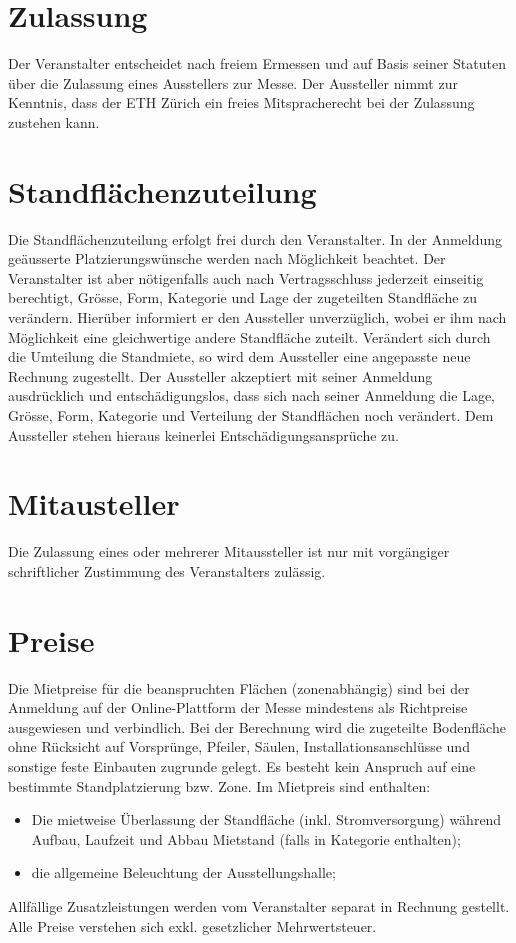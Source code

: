 \documentclass[8pt,a4paper]{article}
\begin{document}
\begin{multicols}{2}
\section{Zulassung}
Der Veranstalter entscheidet nach freiem Ermessen und auf Basis seiner Statuten über die Zulassung eines Ausstellers zur Messe. Der Aussteller nimmt zur Kenntnis, dass der ETH Zürich ein freies Mitspracherecht bei der Zulassung zustehen kann.

\section{Standflächenzuteilung}
Die Standflächenzuteilung erfolgt frei durch den Veranstalter. In der Anmeldung geäusserte Platzierungswünsche werden nach Möglichkeit beachtet. Der Veranstalter ist aber nötigenfalls auch nach Vertragsschluss jederzeit einseitig berechtigt, Grösse, Form, Kategorie und Lage der zugeteilten Standfläche zu verändern. Hierüber informiert er den Aussteller unverzüglich, wobei er ihm nach Möglichkeit eine gleichwertige andere Standfläche zuteilt. Verändert sich durch die Umteilung die Standmiete, so wird dem Aussteller eine angepasste neue Rechnung zugestellt. Der Aussteller akzeptiert mit seiner Anmeldung ausdrücklich und entschädigungslos, dass sich nach seiner Anmeldung die Lage, Grösse, Form, Kategorie und Verteilung der Standflächen noch verändert. Dem Aussteller stehen hieraus keinerlei Entschädigungsansprüche zu.

\section{Mitausteller}
Die Zulassung eines oder mehrerer Mitaussteller ist nur mit vorgängiger schriftlicher Zustimmung des Veranstalters zulässig.

\section{Preise}
Die Mietpreise für die beanspruchten Flächen (zonenabhängig) sind bei der Anmeldung auf der Online-Plattform der Messe mindestens als Richtpreise ausgewiesen und verbindlich. Bei der Berechnung wird die zugeteilte Bodenfläche ohne Rücksicht auf Vorsprünge, Pfeiler, Säulen, Installationsanschlüsse und sonstige feste Einbauten zugrunde gelegt. Es besteht kein Anspruch auf eine bestimmte Standplatzierung bzw. Zone. Im Mietpreis sind enthalten: 
\begin{itemize}
    \item Die mietweise Überlassung der Standfläche (inkl. Stromversorgung) während Aufbau, Laufzeit und Abbau Mietstand (falls in Kategorie enthalten); 
    \item die allgemeine Beleuchtung der Ausstellungshalle;
\end{itemize}
Allfällige Zusatzleistungen werden vom Veranstalter separat in Rechnung gestellt. Alle Preise verstehen sich exkl. gesetzlicher Mehrwertsteuer.


\end{multicols}
\end{document}
